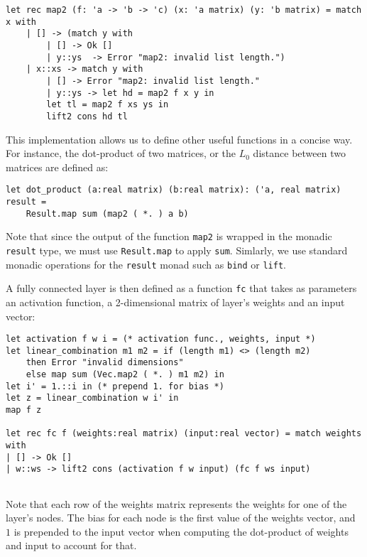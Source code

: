 \documentclass[runningheads]{llncs}
\begin{document}
\begin{lstlisting}[frame=none, language=caml]
let rec map2 (f: 'a -> 'b -> 'c) (x: 'a matrix) (y: 'b matrix) = match x with
	| [] -> (match y with
		| [] -> Ok []
		| y::ys  -> Error "map2: invalid list length.")
	| x::xs -> match y with 
		| [] -> Error "map2: invalid list length." 
		| y::ys -> let hd = map2 f x y in
		let tl = map2 f xs ys in
		lift2 cons hd tl
\end{lstlisting}

This implementation allows us to define other useful functions in a concise way. For instance, the dot-product of two matrices, or the $L_0$ distance between two matrices are defined as:

\begin{lstlisting}[frame=none, language=caml]
let dot_product (a:real matrix) (b:real matrix): ('a, real matrix) result =
	Result.map sum (map2 ( *. ) a b)
\end{lstlisting}

Note that since the output of the function \lstinline{map2} is wrapped in the monadic \lstinline{result} type, we must use \lstinline{Result.map} to apply \lstinline|sum|. Simlarly, we use standard monadic operations for the \lstinline|result| monad such as \lstinline|bind| or \lstinline|lift|.




A fully connected layer is then defined as a function \lstinline{fc} that takes
as parameters an activation function, a 2-dimensional matrix of
layer's weights and an input vector:
\begin{lstlisting}[caption=Fully connected layer implementation, language=caml, label={lst:fully_connected}]
let activation f w i = (* activation func., weights, input *)
let linear_combination m1 m2 = if (length m1) <> (length m2)
    then Error "invalid dimensions" 
    else map sum (Vec.map2 ( *. ) m1 m2) in
let i' = 1.::i in (* prepend 1. for bias *)
let z = linear_combination w i' in
map f z
	
let rec fc f (weights:real matrix) (input:real vector) = match weights with
| [] -> Ok []
| w::ws -> lift2 cons (activation f w input) (fc f ws input)
	
\end{lstlisting} 

Note that each row of the weights matrix
represents the weights for one of the layer's nodes. The bias for each node is
the first value of the weights vector, and $1$ is prepended to the input vector
when computing the dot-product of weights and input to account for that.
\end{document}

